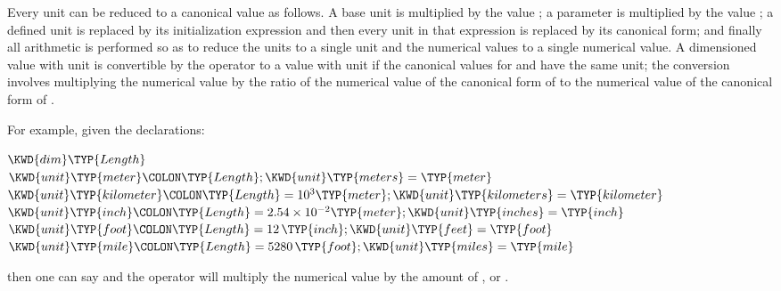 
Every unit can be reduced to a canonical value as follows.  A base unit is
multiplied by the value ; a  parameter is multiplied by
the value ; a defined unit is replaced by its initialization
expression and then every unit in that expression is replaced by its
canonical form;
and finally all arithmetic is performed so as to reduce the
units to a single unit and the
numerical values to a single numerical value.  A dimensioned value with unit
 is convertible by the  operator to a value with unit
 if the canonical values for  and  have the same
unit; the conversion involves multiplying the numerical value by the
ratio of the numerical value of the canonical form
of  to the numerical value of the canonical form of .

For example, given the declarations:
\begin{Fortress}
\(\KWD{dim} \TYP{Length}\)\\
\(\KWD{unit} \TYP{meter}\COLON \TYP{Length}; \KWD{unit} \TYP{meters} = \TYP{meter}\)\\
\(\KWD{unit} \TYP{kilometer}\COLON \TYP{Length} = 10^{3} \TYP{meter}; \KWD{unit} \TYP{kilometers} = \TYP{kilometer}\)\\
\(\KWD{unit} \TYP{inch}\COLON \TYP{Length} = 2.54 \times 10^{-2} \TYP{meter}; \KWD{unit} \TYP{inches} = \TYP{inch} \)\\
\(\KWD{unit} \TYP{foot}\COLON \TYP{Length} = 12\,\TYP{inch}; \KWD{unit} \TYP{feet} = \TYP{foot}\)\\
\(\KWD{unit} \TYP{mile}\COLON \TYP{Length} = 5280\,\TYP{foot}; \KWD{unit} \TYP{miles} = \TYP{mile}\)
\end{Fortress}
then one can say  and
the  operator will multiply the numerical value  by
the amount of
,
or .

